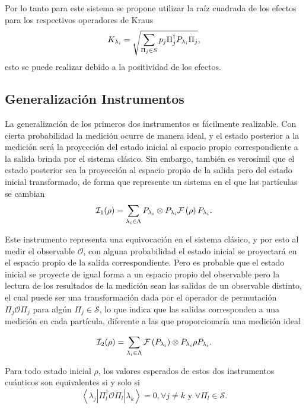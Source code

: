\documentclass[12pt,letterpaper]{book}\raggedbottom{}
\begin{document}
Por lo tanto para este sistema se propone utilizar
la raíz cuadrada de los efectos para los respectivos operadores de Kraus 
\begin{equation}
   K_{\lambda_i}=\sqrt{\sum_{\Pi_j \in S} p_j \Pi_{j}^{\dagger}P_{\lambda_i} \Pi_{j}},
\end{equation} 
esto se puede realizar debido a la positividad de los efectos.

\subsection{Generalización Instrumentos}
La generalización de los primeros dos instrumentos es fácilmente realizable.
Con cierta probabilidad la medición ocurre de manera ideal, y
el estado posterior a la medición será la proyección del estado inicial al
espacio propio correspondiente a la salida brinda por el sistema clásico. Sin
embargo, también es verosímil que el estado posterior sea la proyección al
espacio propio de la salida pero del estado inicial transformado, de forma que
represente un sistema en el que las partículas se cambian
\begin{equation*}
    \mathcal{I}_1(\rho)=\sum_{\lambda_i \in \Lambda }P_{\lambda_i}\otimes P_{\lambda_i}\mathcal{F}\left(\rho\right)P_{\lambda_i}.
\end{equation*} 


Este instrumento representa una equivocación en el sistema clásico,
y por esto al medir el observable $\mathcal{O}$, con alguna probabilidad el
estado inicial se proyectará en el espacio propio de la salida correspondiente.
Pero es probable que el estado inicial se proyecte de igual forma a un espacio
propio del observable pero la lectura de los resultados de la medición sean las
salidas de un observable distinto, el cual puede ser una transformación dada
por el operador de permutación $\Pi_j\mathcal{O}\Pi_j$ para algún $\Pi_j\in
\mathcal{S}$, lo que indica que las salidas corresponden a una medición en cada
partícula, diferente a las que proporcionaría una medición ideal

\begin{equation*}
    \mathcal{I}_2(\rho)= \sum_{\lambda_i \in \Lambda } \mathcal{F}\left(P_{\lambda_i}\right)\otimes P_{\lambda_i}\rho P_{\lambda_i}.
\end{equation*} 


\begin{proposition}
    Para todo estado inicial $\rho$, los valores esperados de estos dos instrumentos
cuánticos son equivalentes si y solo si \[\left \langle \lambda_j \left|\Pi_l^\dagger
\mathcal{O} \Pi_l\right|\lambda_k\right\rangle=0,\forall j\ne k \text{ y }
\forall \Pi_l \in \mathcal{S}.\]
\end{proposition} 
\end{document}
